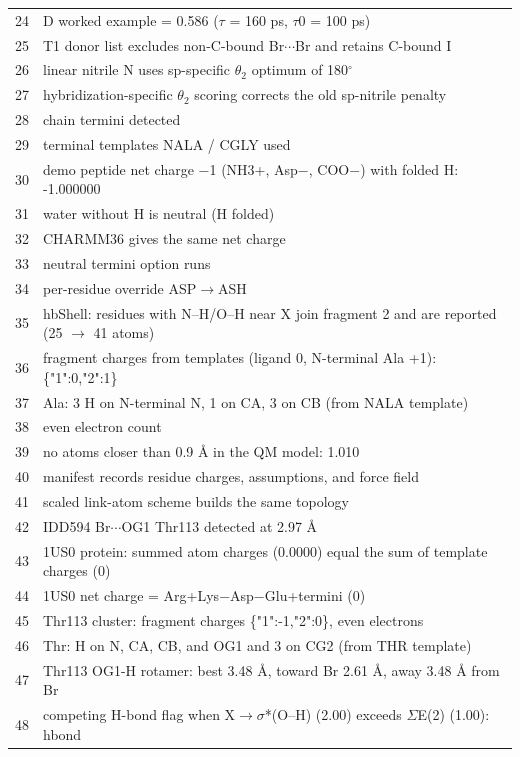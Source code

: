 \documentclass[journal=jcisd8,manuscript=suppinfo]{achemso}
\begin{document}
\begin{singlespace}
{\begin{longtable}{rp{14.5cm}}
24 & D worked example = 0.586 ($\tau$ = 160 ps, $\tau$0 = 100 ps)\\
25 & T1 donor list excludes non-C-bound Br$\cdots$Br and retains C-bound I\\
26 & linear nitrile N uses sp-specific $\theta_2$ optimum of 180$^\circ$\\
27 & hybridization-specific $\theta_2$ scoring corrects the old sp-nitrile penalty\\
28 & chain termini detected\\
29 & terminal templates NALA / CGLY used\\
30 & demo peptide net charge $-$1 (NH3+, Asp$-$, COO$-$) with folded H: -1.000000\\
31 & water without H is neutral (H folded)\\
32 & CHARMM36 gives the same net charge\\
33 & neutral termini option runs\\
34 & per-residue override ASP$\to$ASH\\
35 & hbShell: residues with N--H/O--H near X join fragment 2 and are reported (25 $\to$ 41 atoms)\\
36 & fragment charges from templates (ligand 0, N-terminal Ala +1): \{"1":0,"2":1\}\\
37 & Ala: 3 H on N-terminal N, 1 on CA, 3 on CB (from NALA template)\\
38 & even electron count\\
39 & no atoms closer than 0.9 \AA{} in the QM model: 1.010\\
40 & manifest records residue charges, assumptions, and force field\\
41 & scaled link-atom scheme builds the same topology\\
42 & IDD594 Br$\cdots$OG1 Thr113 detected at 2.97 \AA{}\\
43 & 1US0 protein: summed atom charges (0.0000) equal the sum of template charges (0)\\
44 & 1US0 net charge = Arg+Lys$-$Asp$-$Glu+termini (0)\\
45 & Thr113 cluster: fragment charges \{"1":-1,"2":0\}, even electrons\\
46 & Thr: H on N, CA, CB, and OG1 and 3 on CG2 (from THR template)\\
47 & Thr113 OG1-H rotamer: best 3.48 \AA{}, toward Br 2.61 \AA{}, away 3.48 \AA{} from Br\\
48 & competing H-bond flag when X$\to\sigma$*(O--H) (2.00) exceeds $\Sigma$E(2) (1.00): hbond\\

\end{longtable}}
\end{singlespace}
\end{document}
